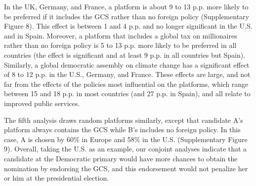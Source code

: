 In the UK, Germany, and France, a platform is about 9 to 13 p.p. more likely to be preferred if it includes the GCS rather than no foreign policy (Supplementary Figure 8). %
This effect is between 1 and 4 p.p. and no longer significant in the U.S. and in Spain. Moreover, a platform that includes a global tax on millionaires rather than no foreign policy is 5 to 13 p.p. more likely to be preferred in all countries (the effect is significant and at least 9 p.p. in all countries but Spain). 
Similarly, a global democratic assembly on climate change has a significant effect of 8 to 12 p.p. in the U.S., Germany, and France. 
These effects are large, and not far from the effects of the policies most influential on the platforms, which range between 15 and 18 p.p. in most countries (and 27 p.p. in Spain), and all relate to improved public services. %

The fifth analysis draws random platforms similarly, except that candidate A's platform always contains the GCS while B's includes no foreign policy. In this case, A is chosen by 60\% in Europe %
and 58\% in the U.S. (Supplementary Figure 9). %
Overall, taking the U.S. as an example, our conjoint analyses indicate that a candidate at the Democratic primary would have more chances to obtain the nomination by endorsing the GCS, and this endorsement would not penalize her or him at the presidential election. 



